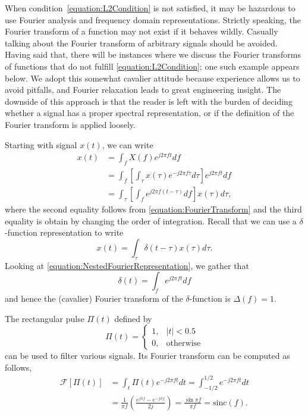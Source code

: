 When condition~\eqref{equation:L2Condition} is not satisfied, it may be hazardous to use Fourier analysis and frequency domain representations.
Strictly speaking, the Fourier transform of a function may not exist if it behaves wildly.
Casually talking about the Fourier transform of arbitrary signals should be avoided.
Having said that, there will be instances where we discuss the Fourier transforms of functions that do not fulfill \eqref{equation:L2Condition};
one such example appears below.
We adopt this somewhat cavalier attitude because experience allows us to avoid pitfalls, and Fourier relaxation leads to great engineering insight.
The downside of this approach is that the reader is left with the burden of deciding whether a signal has a proper spectral representation, or if the definition of the Fourier transform is applied loosely.

Starting with signal $x(t)$, we can write
\begin{equation} \label{equation:NestedFourierRepresentation}
\begin{split}
x(t) &= \int_f X(f) e^{j 2 \pi f t} df \\
&= \int_f \left[ \int_\tau x(\tau) e^{-j 2 \pi f \tau} d\tau \right] e^{j 2 \pi f t} df \\
&= \int_\tau \left[ \int_f e^{j 2 \pi f (t - \tau)} df \right] x(\tau) d\tau ,
\end{split}
\end{equation}
where the second equality follows from \eqref{equation:FourierTransform} and the third equality is obtain by changing the order of integration.
Recall that we can use a $\delta$-function representation to write
\begin{equation*}
x(t) = \int_{\tau} \delta (t - \tau) x(\tau) d\tau .
\end{equation*}
Looking at \eqref{equation:NestedFourierRepresentation}, we gather that
\begin{equation*}
\delta (t) = \int_f e^{j 2 \pi f t} df
\end{equation*}
and hence the (cavalier) Fourier transform of the $\delta$-function is $\Delta(f) = 1$.

\begin{example}
The rectangular pulse $\Pi (t)$ defined by
\begin{equation*}
\Pi (t) = \begin{cases} 1, & |t| < 0.5 \\
0, & \text{otherwise} \end{cases}
\end{equation*}
can be used to filter various signals.
Its Fourier transform can be computed as follows,
\begin{equation*}
\begin{split}
\mathcal{F} \left[ \Pi(t) \right]
&= \int_t \Pi (t) e^{- j 2 \pi f t} dt
= \int_{-1/2}^{1/2} e^{- j 2 \pi f t} dt \\
&= \frac{1}{\pi f} \left( \frac{e^{j \pi f} - e^{- j \pi f}}{2j} \right)
= \frac{ \sin \pi f }{\pi f} = \mathrm{sinc}(f) .
\end{split}
\end{equation*}
\end{example}


